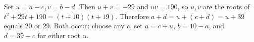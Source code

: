 Set $ u=a-c,v=b-d $. Then $ u+v=-29 $ and $ uv=190 $, so $ u,v $ are the roots of $ t^2+29t+190=(t+10)(t+19)$. Therefore $ a+d=u+(c+d)=u+39 $ equals $\boxed{20\text{ or }29}$. Both occur: choose any $ c $, set $ a=c+u $, $ b=10-a $, and $ d=39-c $ for either root $ u $.
